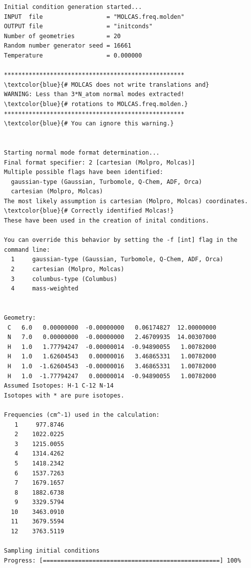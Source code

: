\documentclass[a4paper,11pt,DIV=15,openany]{scrbook}
\begin{document}
\begin{oframed}
\footnotesize\begin{Verbatim}[commandchars=\\\{\}]
Initial condition generation started...
INPUT  file                  = "MOLCAS.freq.molden"
OUTPUT file                  = "initconds"
Number of geometries         = 20
Random number generator seed = 16661
Temperature                  = 0.000000

***************************************************    \textcolor{blue}{# MOLCAS does not write translations and}
WARNING: Less than 3*N_atom normal modes extracted!    \textcolor{blue}{# rotations to MOLCAS.freq.molden.}
***************************************************    \textcolor{blue}{# You can ignore this warning.}


Starting normal mode format determination...
Final format specifier: 2 [cartesian (Molpro, Molcas)]
Multiple possible flags have been identified: 
  gaussian-type (Gaussian, Turbomole, Q-Chem, ADF, Orca) 
  cartesian (Molpro, Molcas)
The most likely assumption is cartesian (Molpro, Molcas) coordinates.    \textcolor{blue}{# Correctly identified Molcas!}
These have been used in the creation of inital conditions.

You can override this behavior by setting the -f [int] flag in the command line:
  1     gaussian-type (Gaussian, Turbomole, Q-Chem, ADF, Orca)
  2     cartesian (Molpro, Molcas)
  3     columbus-type (Columbus)
  4     mass-weighted


Geometry:
 C   6.0   0.00000000  -0.00000000   0.06174827  12.00000000 
 N   7.0   0.00000000  -0.00000000   2.46709935  14.00307000 
 H   1.0   1.77794247  -0.00000014  -0.94890055   1.00782000 
 H   1.0   1.62604543   0.00000016   3.46865331   1.00782000 
 H   1.0  -1.62604543  -0.00000016   3.46865331   1.00782000 
 H   1.0  -1.77794247   0.00000014  -0.94890055   1.00782000 
Assumed Isotopes: H-1 C-12 N-14 
Isotopes with * are pure isotopes.

Frequencies (cm^-1) used in the calculation:
   1     977.8746
   2    1022.0225
   3    1215.0055
   4    1314.4262
   5    1418.2342
   6    1537.7263
   7    1679.1657
   8    1882.6738
   9    3329.5794
  10    3463.0910
  11    3679.5594
  12    3763.5119

Sampling initial conditions
Progress: [==================================================] 100%
\end{Verbatim}
\end{oframed}
\normalsize
\end{document}
